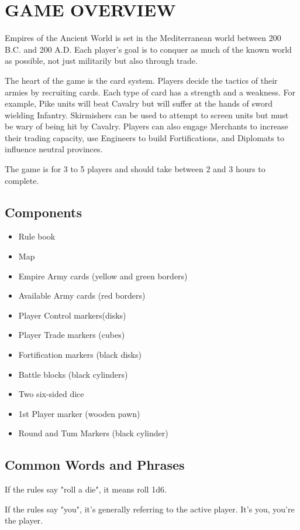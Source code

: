 \section{GAME OVERVIEW}

Empires of the Ancient World is set in the Mediterranean world between 200 B.C. and 200 A.D. Each player’s goal is to conquer as much of the known world as possible, not just militarily but also through trade.

The heart of the game is the card system. Players decide the tactics of their armies by recruiting cards. Each type of card has a strength and a weakness. For example, Pike units will beat Cavalry but will suffer at the hands of sword wielding Infantry. Skirmishers can be used to attempt to screen units but must be wary of being hit by Cavalry. Players can also engage Merchants to increase their trading capacity, use Engineers to build Fortifications, and Diplomats to influence neutral provinces.

The game is for 3 to 5 players and should take between 2 and 3 hours to complete.

\subsection{Components}

\begin{itemize}[nosep]
  \item Rule book
  \item Map
  \item Empire Army cards (yellow and green borders)
  \item Available Army cards (red borders)
  \item Player Control markers(disks)
  \item Player Trade markers (cubes)
  \item Fortification markers (black disks)
  \item Battle blocks (black cylinders)
  \item Two six-sided dice
  \item 1st Player marker (wooden pawn)
  \item Round and Tum Markers (black cylinder)
\end{itemize}

\subsection{Common Words and Phrases}

If the rules say "roll a die", it means roll 1d6.

If the rules say "you", it's generally referring to the active player. It's you, you're the player.